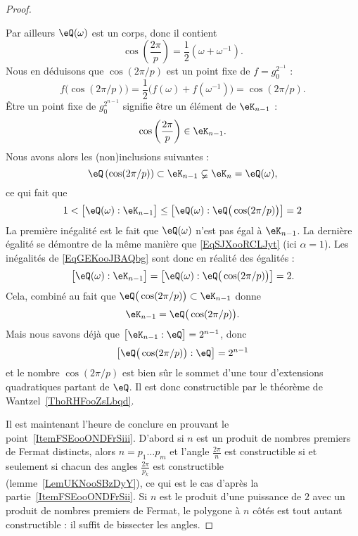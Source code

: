 \begin{proof}
\begin{subproof}
\begin{subproof}
			Par ailleurs \( \eQ(\omega)\) est un corps, donc il contient
			\begin{equation}
				\cos\left( \frac{ 2\pi }{ p } \right)=\frac{ 1 }{2}(\omega+\omega^{-1}).
			\end{equation}
			Nous en déduisons que \( \cos(2\pi/p)\) est un point fixe de \( f=g_0^{2^{-1}}\) :
			\begin{equation}
				f\big( \cos(2\pi/p) \big)=\frac{ 1 }{2}\big( f(\omega)+f(\omega^{-1}) \big)=\cos(2\pi/p).
			\end{equation}
			Être un point fixe de \( g_0^{2^{n-1}}\) signifie être un élément de \( \eK_{n-1}\) :
			\begin{equation}
				\cos\left( \frac{ 2\pi }{ p } \right)\in \eK_{n-1}.
			\end{equation}
			Nous avons alors les (non)inclusions suivantes :
			\begin{equation}
				\eQ\left( \cos(2\pi/p) \right)\subset \eK_{n-1}\varsubsetneq \eK_n=\eQ(\omega),
			\end{equation}
			ce qui fait que
			\begin{equation}    \label{EqGEKooJBAQbg}
				1<\big[ \eQ(\omega):\eK_{n-1} \big]\leq\big[ \eQ(\omega):\eQ\big( \cos(2\pi/p) \big) \big]=2
			\end{equation}
			La première inégalité est le fait que \( \eQ(\omega)\) n'est pas égal à \( \eK_{n-1}\). La dernière égalité se démontre de la même manière que \eqref{EqSJXooRCLJyt} (ici \( \alpha=1\)). Les inégalités de \eqref{EqGEKooJBAQbg} sont donc en réalité des égalités :
			\begin{equation}
				\big[ \eQ(\omega):\eK_{n-1} \big]=\big[ \eQ(\omega):\eQ\big( \cos(2\pi/p) \big) \big]=2.
			\end{equation}
			Cela, combiné au fait que \( \eQ\big( \cos(2\pi/p) \big)\subset \eK_{n-1}\) donne
			\begin{equation}
				\eK_{n-1}=\eQ\big( \cos(2\pi/p) \big).
			\end{equation}
			Mais nous savons déjà que \( \big[ \eK_{n-1}:\eQ \big]=2^{n-1}\), donc
			\begin{equation}
				\big[ \eQ\big( \cos(2\pi/p) \big):\eQ \big]=2^{n-1}
			\end{equation}
			et le nombre \( \cos(2\pi/p)\) est bien sûr le sommet d'une tour d'extensions quadratiques partant de \( \eQ\). Il est donc constructible par le théorème de Wantzel~\ref{ThoRHFooZsLbqd}.
		\end{subproof}
	\end{subproof}
	Il est maintenant l'heure de conclure en prouvant le point~\ref{ItemFSEooONDFrSiii}. D'abord si \( n\) est un produit de nombres premiers de Fermat distincts, alors \( n=p_1\ldots p_m\) et l'angle \( \frac{ 2\pi }{ n }\) est constructible si et seulement si chacun des angles \( \frac{ 2\pi }{ p_k }\) est constructible (lemme~\ref{LemUKNooSBzDyY}), ce qui est le cas d'après la partie~\ref{ItemFSEooONDFrSii}. Si \( n\) est le produit d'une puissance de \( 2\) avec un produit de nombres premiers de Fermat, le polygone à \( n\) côtés est tout autant constructible : il suffit de bissecter les angles.


\end{proof}
